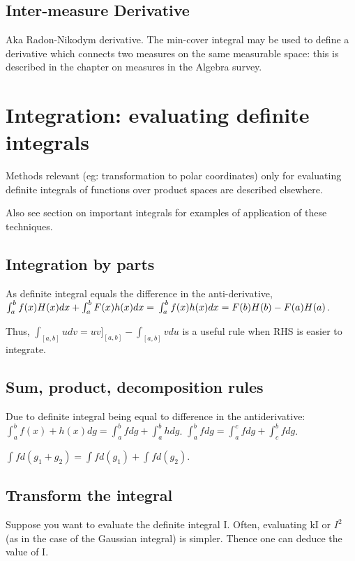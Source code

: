 \documentclass[oneside, article]{memoir}
\begin{document}

\subsection{Inter-measure Derivative}
Aka Radon-Nikodym derivative. The min-cover integral may be used to define a derivative which connects two measures on the same measurable space: this is described in the chapter on measures in the Algebra survey.

\section{Integration: evaluating definite integrals}
Methods relevant (eg: transformation to polar coordinates) only for evaluating definite integrals of functions over product spaces are described elsewhere.

Also see section on important integrals for examples of application of these techniques.

\subsection{Integration by parts}
As definite integral equals the difference in the anti-derivative, $\int_{a}^{b}f(x)H(x)dx + \int_{a}^{b}F(x)h(x)dx =\\
 \int_{a}^{b}f(x)h(x)dx = F(b)H(b) - F(a)H(a)$.

Thus, $\int_{[a, b]} u dv = uv]_{[a, b]} - \int_{[a, b]} v du$ is a useful rule when RHS is easier to integrate.

\subsection{Sum, product, decomposition rules}
Due to definite integral being equal to difference in the antiderivative: $\int_{a}^{b} f(x) + h(x) dg = \int_{a}^{b} f dg + \int_{a}^{b} h dg$. $\int_{a}^{b} f dg = \int_{a}^{c} f dg + \int_{c}^{b} f dg$.

$\int f d(g_{1} + g_{2}) = \int f d(g_{1})+ \int f d(g_{2})$.

\subsection{Transform the integral}
Suppose you want to evaluate the definite integral I. Often, evaluating kI or $I^2$ (as in the case of the Gaussian integral) is simpler. Thence one can deduce the value of I.
\end{document}
